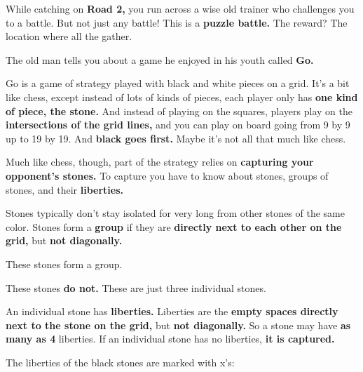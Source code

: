 

While catching \mappMobimon{} on \textbf{Road 2,} you run across a wise old
\mappMobimon{} trainer who challenges you to a \mappMobimon{} battle. But not
just any \mappMobimon{} battle! This is a \textbf{puzzle battle.} The reward?
The location where all the \mappMobimon{} gather.

The old man tells you about a game he enjoyed in his youth called \textbf{Go.}

Go is a game of strategy played with black and white pieces on a grid. It's a
bit like chess, except instead of lots of kinds of pieces, each player only has
\textbf{one kind of piece, the stone.} And instead of playing on the squares,
players play on the \textbf{intersections of the grid lines,} and you can play
on board going from 9 by 9 up to 19 by 19. And \textbf{black goes first.} Maybe
it's not all that much like chess.

Much like chess, though, part of the strategy relies on \textbf{capturing your
  opponent's stones.} To capture you have to know about stones, groups of
stones, and their \textbf{liberties.}

Stones typically don't stay isolated for very long from other stones of the same
color. Stones form a \textbf{group} if they are \textbf{directly next to each
  other on the grid,} but \textbf{not diagonally.}

These stones form a group.

\begin{center}
  \showgoban
\end{center}
\cleargoban

These stones \textbf{do not.} These are just three individual stones.

\begin{center}
  \showgoban
\end{center}
\cleargoban

An individual stone has \textbf{liberties.} Liberties are the \textbf{empty
  spaces directly next to the stone on the grid,} but \textbf{not diagonally.}
So a stone may have \textbf{as many as 4} liberties. If an individual stone has
no liberties, \textbf{it is captured.}

The liberties of the black stones are marked with x's:

\begin{center}
  \showgoban
\end{center}
\cleargoban
\cleargobansymbols

